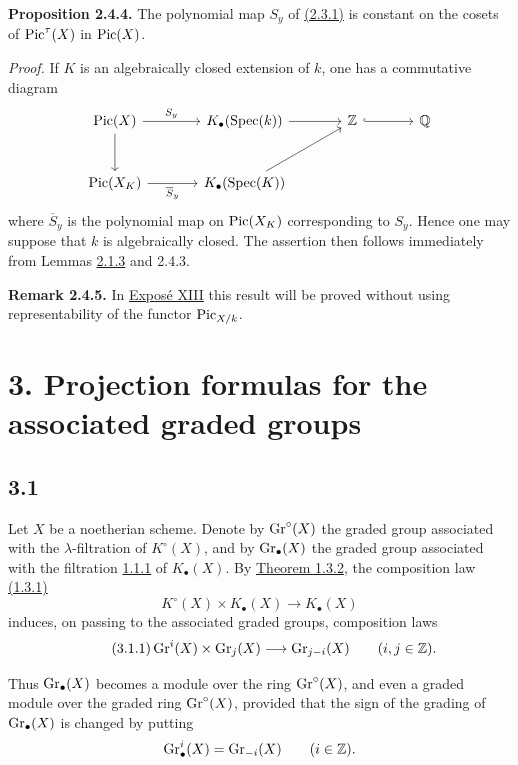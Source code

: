\textbf{Proposition 2.4.4.}
The polynomial map $S_y$ of \hyperlink{sga6.e10.prop.2-3-1}{(2.3.1)} is constant on the cosets of
$\operatorname{Pic}^\tau(X)$ in $\operatorname{Pic}(X)$.

\emph{Proof.}
If $K$ is an algebraically closed extension of $k$, one has a commutative
diagram
\[
\begin{tikzcd}[column sep=large,row sep=large]
\Pic(X) \arrow[r,"S_y"] \arrow[d] &
K_\bullet(\Spec(k)) \arrow[r] &
\mathbb Z \arrow[r,hook] & \mathbb Q\\
\Pic(X_K) \arrow[r,"\overline S_y"'] &
K_\bullet(\Spec(K)) \arrow[ur] &&
\end{tikzcd}
\]
where $\overline S_y$ is the polynomial map on $\operatorname{Pic}(X_K)$ corresponding to
$S_y$. Hence one may suppose that $k$ is algebraically closed. The
assertion then follows immediately from Lemmas \hyperlink{sga6.e10.lem.2-1-3}{2.1.3} and 2.4.3.

\textbf{Remark 2.4.5.}
In \hyperlink{sga6.e13.expose}{Expos\'e XIII} this result will be proved without using representability of
the functor $\operatorname{Pic}_{X/k}$.

\section*{3. Projection formulas for the associated graded groups}

\subsection*{3.1}
Let $X$ be a noetherian scheme. Denote by $\operatorname{Gr}^{\circ}(X)$ the graded group associated
with the \mbox{$\lambda$-filtration} of $K^\circ(X)$, and by $\operatorname{Gr}_{\bullet}(X)$ the graded
group associated with the filtration \hyperlink{sga6.e10.def.1-1-1}{1.1.1} of $K_\bullet(X)$. By \hyperlink{sga6.e10.thm.1-3-2}{Theorem
1.3.2}, the composition law \hyperlink{sga6.e10.eq.1-3-1}{(1.3.1)}
\[
K^\circ(X)\times K_\bullet(X)\longrightarrow K_\bullet(X)
\]
induces, on passing to the associated graded groups, composition laws
\begin{equation}\tag{3.1.1}
\operatorname{Gr}^i(X)\times\operatorname{Gr}_j(X)\longrightarrow\operatorname{Gr}_{j-i}(X)
\qquad(i,j\in\mathbb Z).
\end{equation}

Thus $\operatorname{Gr}_{\bullet}(X)$ becomes a module over the ring $\operatorname{Gr}^{\circ}(X)$, and even a graded
module over the graded ring $\operatorname{Gr}^{\circ}(X)$, provided that the sign of the grading
of $\operatorname{Gr}_{\bullet}(X)$ is changed by putting
\[
\operatorname{Gr}^i_\bullet(X)=\operatorname{Gr}_{-i}(X)\qquad(i\in\mathbb Z).
\]

